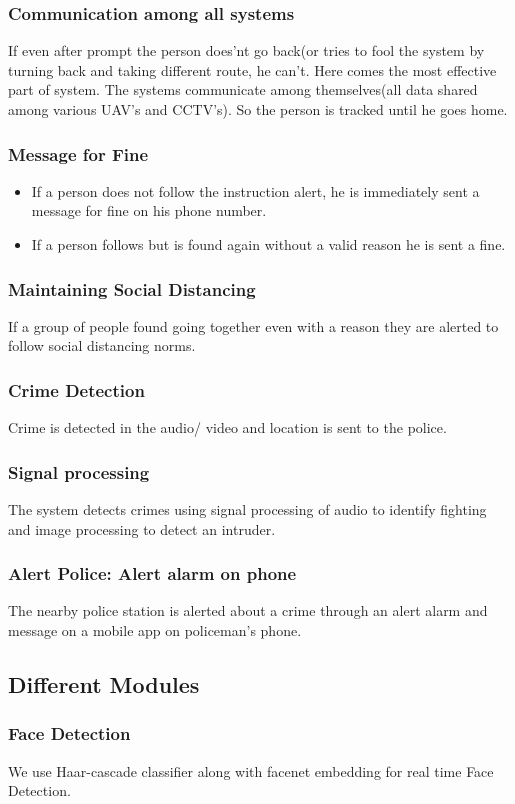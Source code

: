 \documentclass[10pt,twocolumn,letterpaper]{article}
\begin{document}
\subsubsection{Communication among all systems}
If even after prompt the person does'nt go back(or tries to fool the system by turning back and taking different route, he can't. Here comes the most effective part of system. The systems communicate among themselves(all data shared among various UAV's and CCTV's). So the person is tracked until he goes home.
\subsubsection{Message for Fine}
\begin{itemize}
\item If a person does not follow the instruction alert, he is immediately sent a message for fine on his phone number.
\item If a person follows but is found again without a valid reason he is sent a fine.
\end{itemize}
\subsubsection{Maintaining Social Distancing}
If a group of people found going together even with a reason they are alerted to follow social distancing norms.
\subsubsection{Crime Detection} Crime is detected in the audio/ video and location is sent to the police.
\subsubsection{Signal processing}
The system detects crimes  using  signal processing of audio to identify fighting  and image processing to detect an intruder.
\subsubsection{Alert Police: Alert alarm on phone}
The nearby police station is alerted about a crime through an alert alarm and message on a mobile app on policeman's phone.

\subsection{Different Modules}
\subsubsection{Face Detection} 
We use Haar-cascade classifier along with facenet embedding for real time Face Detection.
\end{document}
